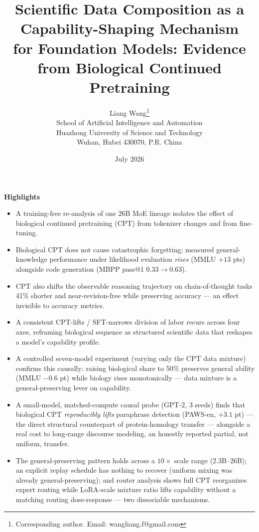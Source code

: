 \documentclass[11pt]{article}
\title{\textbf{Scientific Data Composition as a Capability-Shaping Mechanism\\
for Foundation Models: Evidence from Biological Continued Pretraining}}
\author{Liang Wang\thanks{Corresponding author. Email: wangliang.f@gmail.com}\\
\small School of Artificial Intelligence and Automation\\
\small Huazhong University of Science and Technology\\
\small Wuhan, Hubei 430070, P.R. China}
\date{July 2026}
\begin{document}
\maketitle

\noindent\textbf{Highlights}
\begin{itemize}\itemsep2pt
\item A training-free re-analysis of one 26B MoE lineage isolates the effect of biological
continued pretraining (CPT) from tokenizer changes and from fine-tuning.
\item Biological CPT does not cause catastrophic forgetting; measured general-knowledge
performance under likelihood evaluation \emph{rises} (MMLU $+13$ pts) alongside code generation
(MBPP pass@1 $0.33\!\to\!0.63$).
\item CPT also shifts the observable reasoning trajectory on chain-of-thought tasks 41\% shorter
and near-revision-free while preserving accuracy --- an effect invisible to accuracy metrics.
\item A consistent CPT-lifts / SFT-narrows division of labor recurs across four axes, reframing
biological sequence as structured scientific data that reshapes a model's capability profile.
\item A controlled seven-model experiment (varying only the CPT data mixture) confirms this
causally: raising biological share to 50\% preserves general ability (MMLU $-0.6$ pt) while
biology rises monotonically --- data mixture is a general-preserving lever on capability.
\item A small-model, matched-compute causal probe (GPT-2, 3 seeds) finds that biological CPT
\emph{reproducibly lifts} paraphrase detection (PAWS-en, $+3.1$ pt) --- the direct structural
counterpart of protein-homology transfer --- alongside a real cost to long-range discourse
modeling, an honestly reported partial, not uniform, transfer.
\item The general-preserving pattern holds across a $10\times$ scale range (2.3B--26B); an
explicit replay schedule has nothing to recover (uniform mixing was already general-preserving);
and router analysis shows full CPT reorganizes expert routing while LoRA-scale mixture ratio
lifts capability without a matching routing dose-response --- two dissociable mechanisms.
\end{itemize}
\end{document}
